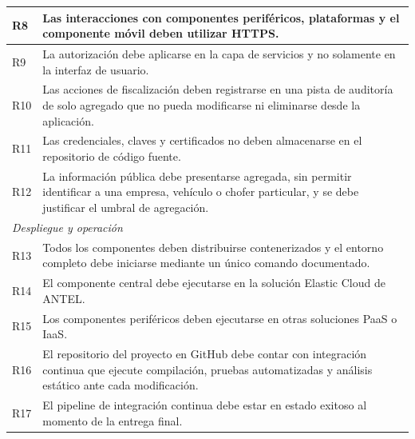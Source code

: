 \begin{longtable}{|p{1.2cm}|p{14.3cm}|}
    \hline
    R8 & Las interacciones con componentes periféricos, plataformas y el componente móvil deben utilizar HTTPS. \\
    \hline
    R9 & La autorización debe aplicarse en la capa de servicios y no solamente en la interfaz de usuario. \\
    \hline
    R10 & Las acciones de fiscalización deben registrarse en una pista de auditoría de solo agregado que no pueda modificarse ni eliminarse desde la aplicación. \\
    \hline
    R11 & Las credenciales, claves y certificados no deben almacenarse en el repositorio de código fuente. \\
    \hline
    R12 & La información pública debe presentarse agregada, sin permitir identificar a una empresa, vehículo o chofer particular, y se debe justificar el umbral de agregación. \\
    \hline
    \multicolumn{2}{|l|}{\textit{Despliegue y operación}} \\
    \hline
    R13 & Todos los componentes deben distribuirse contenerizados y el entorno completo debe iniciarse mediante un único comando documentado. \\
    \hline
    R14 & El componente central debe ejecutarse en la solución Elastic Cloud de ANTEL. \\
    \hline
    R15 & Los componentes periféricos deben ejecutarse en otras soluciones PaaS o IaaS. \\
    \hline
    R16 & El repositorio del proyecto en GitHub debe contar con integración continua que ejecute compilación, pruebas automatizadas y análisis estático ante cada modificación. \\
    \hline
    R17 & El pipeline de integración continua debe estar en estado exitoso al momento de la entrega final. \\
    \hline
\end{longtable}
